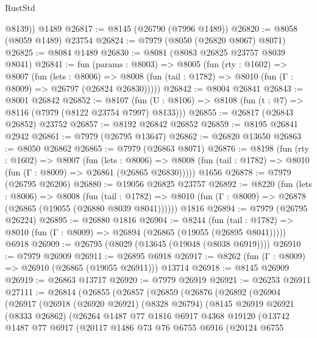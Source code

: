 \begin{lexlean}{RustStd}
\begin{coremodule}
        @8139))
    @1489
@26817 := @8145 (@26790 (@7996 @1489))
@26820 := @8058 (@8059 @1489) @23754
@26824 := @7979 (@8050 (@26820 @8067) @8071)
@26825 := @8084 @1489
@26830 := @8081 (@8083 @26825 @23757 @8039 @8041)
@26841 := fun (params : @8003) =>
  @8005
    (fun (rty : @1602) =>
    @8007
      (fun (lets : @8006) =>
      @8008 (fun (tail : @1782) => @8010 (fun (Γ : @8009) => @26797 (@26824 @26830)))))
@26842 := @8004 @26841
@26843 := @8001 @26842
@26852 := @8107
    (fun (U : @8106) => @8108 (fun (t : @7) => @8116 (@7979 (@8122 @23754 @7997) @8133)))
@26855 := @26817 (@26843 @26852) @23752
@26857 := @8192 @26842 @26852
@26859 := @8195 @26841 @2942
@26861 := @7979 (@26795 @13647)
@26862 := @26820 @13650
@26863 := @8050 @26862
@26865 := @7979 (@26863 @8071)
@26876 := @8198
    (fun (rty : @1602) =>
    @8007
      (fun (lets : @8006) =>
      @8008 (fun (tail : @1782) => @8010 (fun (Γ : @8009) => @26861 (@26865 @26830)))))
    @1656
@26878 := @7979 (@26795 @26206)
@26880 := @19056 @26825 @23757
@26892 := @8220
    (fun (lets : @8006) =>
    @8008
      (fun (tail : @1782) =>
      @8010 (fun (Γ : @8009) => @26878 (@26865 (@19055 (@26880 @8039 @8041))))))
    @1816
@26894 := @7979 (@26795 @26224)
@26895 := @26880 @1816
@26904 := @8244
    (fun (tail : @1782) => @8010 (fun (Γ : @8009) => @26894 (@26865 (@19055 (@26895 @8041)))))
    @6918
@26909 := @26795 (@8029 (@13645 (@19048 (@8038 @6919))))
@26910 := @7979 @26909
@26911 := @26895 @6918
@26917 := @8262 (fun (Γ : @8009) => @26910 (@26865 (@19055 @26911))) @13714
@26918 := @8145 @26909
@26919 := @26863 @13717
@26920 := @7979 @26919
@26921 := @26253 @26911
@27111 := @26814
    (@26855
      (@26857
        (@26859
          (@26876
            (@26892
              (@26904
                (@26917
                  (@26918
                    (@26920 @26921)
                    (@8328 @26794)
                    (@8145
                      @26919
                      @26921
                      (@8333 @26862)
                      (@26264
                        @1487
                        @77
                        @1816
                        @6917
                        @4368
                        @19120
                        (@13742
                          @1487
                          @77
                          @6917
                          (@20117
                            @1486
                            @73
                            @76
                            @6755
                            @6916
                            (@20124
                              @6755

\end{coremodule}
\end{lexlean}
